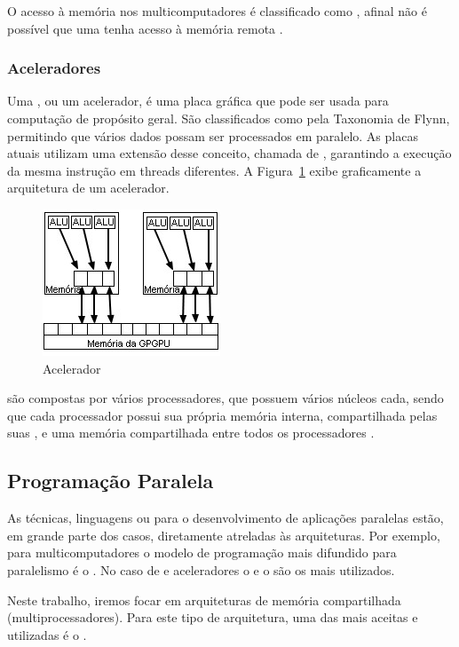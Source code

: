 O acesso à memória nos multicomputadores é classificado como \norma, afinal não é possível que uma \cpu tenha acesso à memória remota \cite{Hwang1998}.

\subsubsection{Aceleradores}

Uma \gpgpu, ou um acelerador, é uma placa gráfica que pode ser usada para computação de propósito geral. São classificados como \simd pela Taxonomia de Flynn, permitindo que vários dados possam ser processados em paralelo. As placas atuais utilizam uma extensão desse conceito, chamada de \simt, garantindo a execução da mesma instrução em threads diferentes. A Figura~\ref{fig:acel} exibe graficamente a arquitetura de um acelerador.

\begin{figure}[t]
    \centering
    \includegraphics{Images/gpgpu.jpg}
    \caption{Acelerador}\label{fig:acel}
\end{figure}

\gpgpus são compostas por vários processadores, que possuem vários núcleos cada, sendo que cada processador possui sua própria memória interna, compartilhada pelas suas \alus, e uma memória compartilhada entre todos os processadores \cite{Miranda2010}.

\subsection{Programação Paralela}

As técnicas, linguagens ou \apis para o desenvolvimento de aplicações paralelas estão, em grande parte dos casos, diretamente atreladas às arquiteturas. Por exemplo, para multicomputadores o modelo de programação mais difundido para paralelismo é o \mpi. No caso de \gpus e aceleradores o \cuda e o \opencl são os mais utilizados.

Neste trabalho, iremos focar em arquiteturas de memória compartilhada (multiprocessadores). Para este tipo de arquitetura, uma das \apis mais aceitas e utilizadas é o \openMP.

